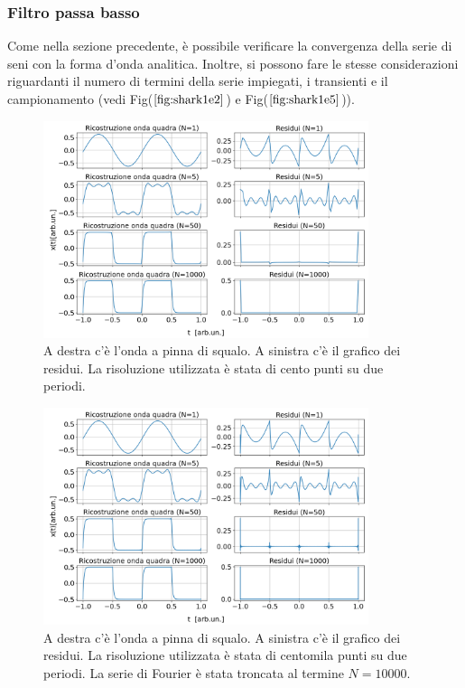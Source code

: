 \documentclass{article}
\begin{document}
        \subsubsection{Filtro passa basso}
            \label{sez:int_quadra}
            Come nella sezione precedente, è possibile verificare la convergenza della serie di 
            seni con la forma d'onda analitica.
            Inoltre, si possono fare le stesse considerazioni riguardanti 
            il numero di termini della serie impiegati, i transienti e il campionamento
            (vedi Fig($\ref{fig:shark1e2}$) e Fig($\ref{fig:shark1e5}$)).
                    \begin{figure}[H]
                        \centering
                        \includegraphics[width=0.85\textwidth]{fousharkfins1e2.png} %
                        \caption{A destra c'è l'onda a pinna di squalo.
                        A sinistra c'è il grafico dei residui.
                        La risoluzione utilizzata è stata di cento punti su due periodi.}
                        \label{fig:shark1e2}
                    \end{figure}
                    \begin{figure}[H]
                        \centering
                        \includegraphics[width=0.85\textwidth]{fousharkfins1e5.png} %
                        \caption{A destra c'è l'onda a pinna di squalo.
                        A sinistra c'è il grafico dei residui.
                        La risoluzione utilizzata è stata di centomila punti su due periodi.
                        La serie di Fourier è stata troncata al termine $N=10000$.}
                        \label{fig:shark1e5}
                    \end{figure}
\end{document}
